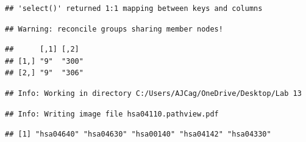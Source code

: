 \documentclass[
]{article}
\newenvironment{Shaded}{\begin{snugshade}}{\end{snugshade}}
\newcommand{\AttributeTok}[1]{\textcolor[rgb]{0.77,0.63,0.00}{#1}}
\newcommand{\CommentTok}[1]{\textcolor[rgb]{0.56,0.35,0.01}{\textit{#1}}}
\newcommand{\DecValTok}[1]{\textcolor[rgb]{0.00,0.00,0.81}{#1}}
\newcommand{\DocumentationTok}[1]{\textcolor[rgb]{0.56,0.35,0.01}{\textbf{\textit{#1}}}}
\newcommand{\FloatTok}[1]{\textcolor[rgb]{0.00,0.00,0.81}{#1}}
\newcommand{\FunctionTok}[1]{\textcolor[rgb]{0.00,0.00,0.00}{#1}}
\newcommand{\NormalTok}[1]{#1}
\newcommand{\OtherTok}[1]{\textcolor[rgb]{0.56,0.35,0.01}{#1}}
\newcommand{\SpecialCharTok}[1]{\textcolor[rgb]{0.00,0.00,0.00}{#1}}
\newcommand{\StringTok}[1]{\textcolor[rgb]{0.31,0.60,0.02}{#1}}
\begin{document}
\begin{verbatim}
## 'select()' returned 1:1 mapping between keys and columns
\end{verbatim}

\begin{verbatim}
## Warning: reconcile groups sharing member nodes!
\end{verbatim}

\begin{verbatim}
##      [,1] [,2] 
## [1,] "9"  "300"
## [2,] "9"  "306"
\end{verbatim}

\begin{verbatim}
## Info: Working in directory C:/Users/AJCag/OneDrive/Desktop/Lab 13
\end{verbatim}

\begin{verbatim}
## Info: Writing image file hsa04110.pathview.pdf
\end{verbatim}

\begin{Shaded}
\end{Shaded}

\begin{verbatim}
## [1] "hsa04640" "hsa04630" "hsa00140" "hsa04142" "hsa04330"
\end{verbatim}

\begin{Shaded}
\end{Shaded}
\end{document}
